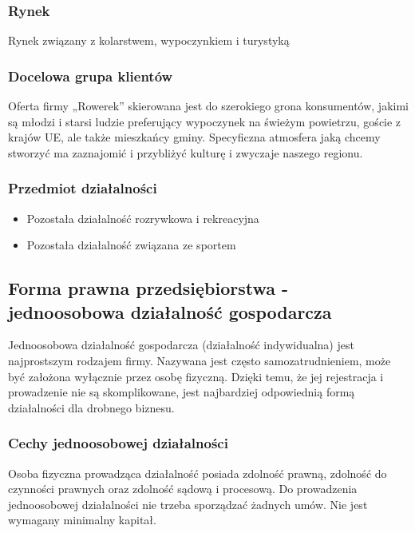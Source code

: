 \documentclass{sprawozdanie-agh}
\begin{document}
		\subsubsection{Rynek}
		Rynek związany z kolarstwem, wypoczynkiem i turystyką

		\subsubsection{Docelowa grupa klientów}
		Oferta firmy „Rowerek” skierowana jest do szerokiego grona konsumentów, jakimi są młodzi i starsi ludzie preferujący wypoczynek na świeżym powietrzu, goście z krajów UE, ale także mieszkańcy gminy. Specyficzna atmosfera jaką chcemy stworzyć ma zaznajomić i przybliżyć kulturę i zwyczaje naszego regionu.

		\subsubsection{Przedmiot działalności}
		\begin{itemize}
			\item Pozostała działalność rozrywkowa i rekreacyjna
			\item Pozostała działalność związana ze sportem
		\end{itemize}

		\subsection{Forma prawna przedsiębiorstwa - jednoosobowa działalność gospodarcza}

		Jednoosobowa działalność gospodarcza (działalność indywidualna) jest najprostszym rodzajem firmy. Nazywana jest często samozatrudnieniem, może być założona wyłącznie przez osobę fizyczną. Dzięki temu, że jej rejestracja i prowadzenie nie są skomplikowane, jest najbardziej odpowiednią formą działalności dla drobnego biznesu.

		\subsubsection{Cechy jednoosobowej działalności}
		Osoba fizyczna prowadząca działalność posiada zdolność prawną, zdolność do czynności prawnych oraz zdolność sądową i procesową. Do prowadzenia jednoosobowej działalności nie trzeba sporządzać żadnych umów. Nie jest wymagany minimalny kapitał.
\end{document}
